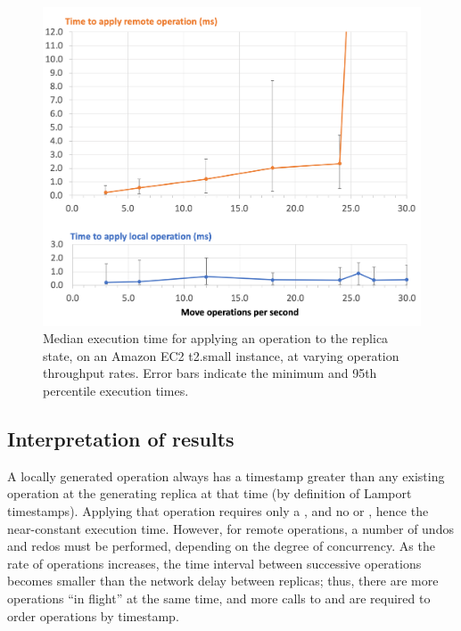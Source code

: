 \documentclass[sigplan,anonymous]{acmart}
\begin{document}
\begin{figure}
  \includegraphics[width=\columnwidth,keepaspectratio=true]{plots.png}
  \caption{Median execution time for applying an operation to the replica state, on an Amazon EC2 t2.small instance, at varying operation throughput rates. Error bars indicate the minimum and 95th percentile execution times.}
  \label{fig:plots}
\end{figure}

\subsection{Interpretation of results}

A locally generated operation always has a timestamp greater than any existing operation at the generating replica at that time (by definition of Lamport timestamps).
Applying that operation requires only a , and no  or , hence the near-constant execution time.
However, for remote operations, a number of undos and redos must be performed, depending on the degree of concurrency.
As the rate of operations increases, the time interval between successive operations becomes smaller than the network delay between replicas; thus, there are more operations ``in flight'' at the same time, and more calls to  and  are required to order operations by timestamp.
\end{document}
